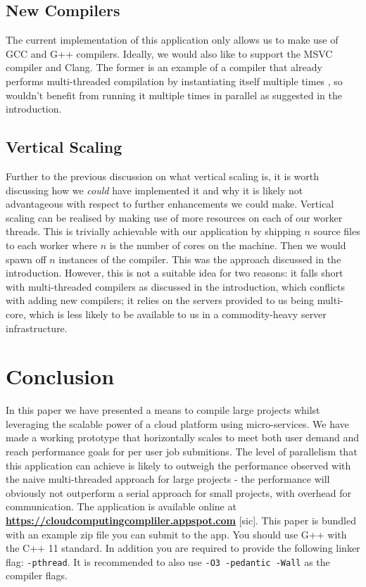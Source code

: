 \documentclass[conference]{IEEEtran}
\begin{document}
\subsection{New Compilers}
The current implementation of this application only allows us to make use of GCC
and G++ compilers. Ideally, we would also like to support the MSVC compiler and
Clang. The former is an example of a compiler that already performs
multi-threaded compilation by instantiating itself multiple times \cite{MSVC},
so wouldn't benefit from running it multiple times in parallel as suggested in the
introduction.
\subsection{Vertical Scaling}
Further to the previous discussion on what vertical scaling is, it is worth
discussing how we \emph{could} have implemented it and why it is likely not
advantageous with respect to further enhancements we could make. Vertical
scaling can be realised by making use of more resources on each of our worker
threads. This is trivially achievable with our application by shipping $n$
source files to each worker where $n$ is the number of cores on the machine.
Then we would spawn off $n$ instances of the compiler. This was the approach
discussed in the introduction. However, this is not a suitable idea for two
reasons: it falls short with multi-threaded compilers as
discussed in the introduction, which conflicts with adding new compilers; it
relies on the servers provided to us being multi-core, which is less likely to
be available to us in a commodity-heavy server infrastructure.
\section{Conclusion}
In this paper we have presented a means to compile large projects whilst
leveraging the scalable power of a cloud platform using micro-services. We have
made a working prototype that horizontally scales to
meet both user demand and reach performance goals for per user job submitions.
The level of parallelism that this application can achieve is likely to outweigh
the performance observed with the naive multi-threaded approach for large
projects - the performance will obviously not outperform a serial approach for
small projects, with overhead for communication.
The application is available online at
\textbf{\url{https://cloudcomputingcompliler.appspot.com}} [sic].
This paper is bundled with an example zip file you can submit to the app. You
should use G++ with the C++ 11 standard. In addition you are required to provide
the following linker flag: \texttt{-pthread}. It is recommended to also use
\texttt{-O3 -pedantic -Wall} as the compiler flags.
\end{document}
